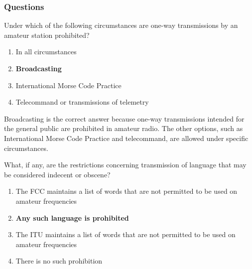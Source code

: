 

\subsubsection{Questions}

\begin{tcolorbox}[colback=gray!10!white,colframe=black!75!black,title={T1D02}]
Under which of the following circumstances are one-way transmissions by an amateur station prohibited?
\begin{enumerate}[label=\Alph*),noitemsep]
    \item In all circumstances
    \item \textbf{Broadcasting}
    \item International Morse Code Practice
    \item Telecommand or transmissions of telemetry
\end{enumerate}
\end{tcolorbox}

Broadcasting is the correct answer because one-way transmissions intended for the general public are prohibited in amateur radio. The other options, such as International Morse Code Practice and telecommand, are allowed under specific circumstances.

\begin{tcolorbox}[colback=gray!10!white,colframe=black!75!black,title={T1D06}]
What, if any, are the restrictions concerning transmission of language that may be considered indecent or obscene?
\begin{enumerate}[label=\Alph*),noitemsep]
    \item The FCC maintains a list of words that are not permitted to be used on amateur frequencies
    \item \textbf{Any such language is prohibited}
    \item The ITU maintains a list of words that are not permitted to be used on amateur frequencies
    \item There is no such prohibition
\end{enumerate}
\end{tcolorbox}

